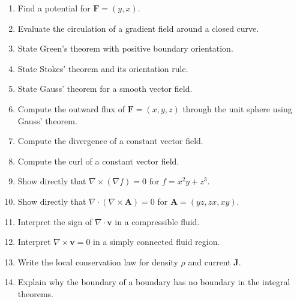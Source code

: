 \begin{enumerate}[label=\textbf{\arabic*.},leftmargin=*]
\item Find a potential for $\mathbf F=(y,x)$.
\item Evaluate the circulation of a gradient field around a closed curve.
\item State Green's theorem with positive boundary orientation.
\item State Stokes' theorem and its orientation rule.
\item State Gauss' theorem for a smooth vector field.
\item Compute the outward flux of $\mathbf F=(x,y,z)$ through the unit sphere using Gauss' theorem.
\item Compute the divergence of a constant vector field.
\item Compute the curl of a constant vector field.
\item Show directly that $\nabla\times(\nabla f)=0$ for $f=x^2y+z^3$.
\item Show directly that $\nabla\cdot(\nabla\times\mathbf A)=0$ for $\mathbf A=(yz,zx,xy)$.
\item Interpret the sign of $\nabla\cdot\mathbf v$ in a compressible fluid.
\item Interpret $\nabla\times\mathbf v=0$ in a simply connected fluid region.
\item Write the local conservation law for density $\rho$ and current $\mathbf J$.
\item Explain why the boundary of a boundary has no boundary in the integral theorems.
\end{enumerate}
